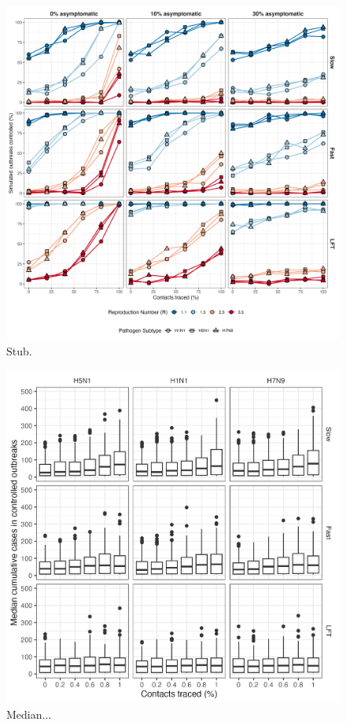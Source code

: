 \documentclass{article}
\begin{document}
\begin{figure}[ht]
\centering
\includegraphics[width=\textwidth]{../plots/prop_outbreak_control_prop_asym_iso.png}
\caption{Stub.}
\label{fig:prop-outbreak-control-prop-asym-iso}
\end{figure}

\begin{figure}[ht]
\centering
\includegraphics[width=\textwidth]{../plots/median_controlled_outbreak_size.png}
\caption{Median...}
\label{fig:median-controlled-outbreak-size}
\end{figure}
\end{document}
